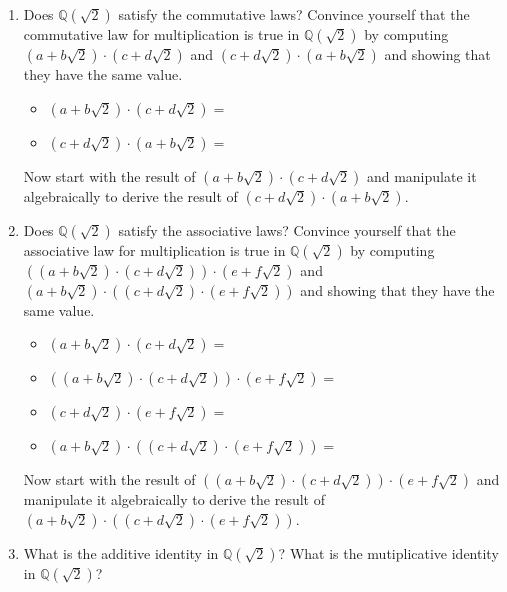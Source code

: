 \documentclass[11pt]{article}
\theoremstyle{definition}
\begin{document}
  \begin{enumerate}
    \item Does $\mathbb{Q}(\sqrt{2})$ satisfy the commutative laws? Convince yourself that the commutative law for multiplication is true in $\mathbb{Q}(\sqrt{2})$
      by computing $(a+b\sqrt{2})\cdot (c+d\sqrt{2})$ and $(c+d\sqrt{2})\cdot (a+b\sqrt{2})$ and showing that they have the same value.
      \begin{itemize}
        \item $(a+b\sqrt{2})\cdot (c+d\sqrt{2}) = $
        \item $(c+d\sqrt{2})\cdot (a+b\sqrt{2}) = $
      \end{itemize}
      Now start with the result of $(a+b\sqrt{2})\cdot (c+d\sqrt{2})$ and manipulate it algebraically to derive the result of $(c+d\sqrt{2})\cdot (a+b\sqrt{2})$.

      \vspace{1in}

    \item Does $\mathbb{Q}(\sqrt{2})$ satisfy the associative laws? Convince yourself that the associative law for multiplication is true in $\mathbb{Q}(\sqrt{2})$
      by computing $((a+b\sqrt{2})\cdot (c+d\sqrt{2}))\cdot (e + f\sqrt{2})$ and $(a+b\sqrt{2})\cdot ( (c+d\sqrt{2})\cdot (e+f\sqrt{2}) )$ and showing that 
      they have the same value.
      \begin{itemize}
        \item $(a+b\sqrt{2})\cdot (c+d\sqrt{2}) =$
        \item $((a+b\sqrt{2})\cdot (c+d\sqrt{2}))\cdot (e + f\sqrt{2}) = $
      \end{itemize}
      \vspace{1in}
      \begin{itemize}
        \item $(c+d\sqrt{2})\cdot (e+f\sqrt{2}) = $
        \item $(a+b\sqrt{2})\cdot ( (c+d\sqrt{2})\cdot (e+f\sqrt{2}) ) =$
      \end{itemize}
      \vspace{1in}
      Now start with the result of $((a+b\sqrt{2})\cdot (c+d\sqrt{2}))\cdot (e + f\sqrt{2})$ and manipulate it algebraically to derive the result of 
      $(a+b\sqrt{2})\cdot ( (c+d\sqrt{2})\cdot (e+f\sqrt{2}) )$.

      \vspace{1.25in}


    \item What is the additive identity in $\mathbb{Q}(\sqrt{2})$? What is the mutiplicative identity in $\mathbb{Q}(\sqrt{2})$?


\end{enumerate}
\end{document}
